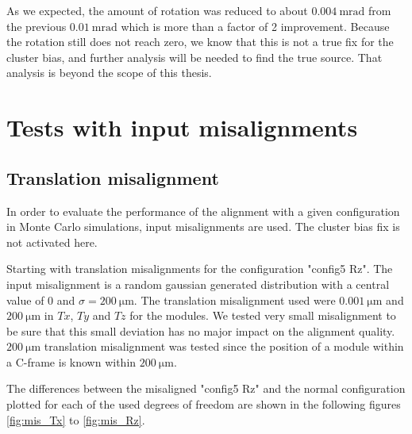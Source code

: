 As we expected, the amount of rotation was reduced to about
$\SI{0.004}{\milli\radian}$ from the previous $\SI{0.01}{\milli\radian}$ which is more than a factor of 2 improvement. Because the rotation still does not reach zero, we know that this is not a true fix for the cluster bias, and further analysis will be needed to find the true source. That analysis is beyond the scope of this thesis.

\section{Tests with input misalignments}
\label{sec:misalignment}
\subsection{Translation misalignment}
\label{sec:misT}

In order to evaluate the performance of the alignment with a given configuration in Monte Carlo simulations, input misalignments are used. The cluster bias fix is not activated here.

Starting with translation misalignments for the configuration "config5 Rz". The input misalignment is a random gaussian generated distribution with a central value of 0 and
$\sigma = \SI{200}{\micro\metre}$. The translation misalignment used were $\SI{0.001}{\micro\metre}$ and $\SI{200}{\micro\metre}$ in $Tx$, $Ty$ and $Tz$ for the modules. We tested very small misalignment to be sure that this small deviation has no major impact on the alignment quality. $\SI{200}{\micro\metre}$ translation misalignment was tested since the position of a module within a C-frame is known within $\SI{200}{\micro\metre}$.

The differences between the misaligned "config5 Rz" and the normal configuration plotted for each of the used degrees of freedom are shown in the following figures \ref{fig:mis_Tx} to \ref{fig:mis_Rz}.

